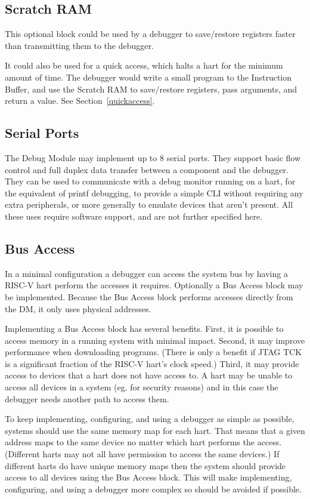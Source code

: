 \documentclass{article}
\begin{document}
\subsection{Scratch RAM}

This optional block could be used by a debugger to save/restore registers
faster than transmitting them to the debugger.

It could also be used for a quick access, which halts a hart for the minimum
amount of time. The debugger would write a small program to the Instruction
Buffer, and use the Scratch RAM to save/restore registers, pass arguments, and
return a value. See Section~\ref{quickaccess}.

\subsection{Serial Ports}

The Debug Module may implement up to 8 serial ports. They support basic flow
control and full duplex data transfer between a component and the debugger.
They can be used to communicate with a debug monitor running on a hart, for the
equivalent of printf debugging, to provide a simple CLI without requiring any
extra peripherals, or more generally to emulate devices that aren't present.
All these uses require software support, and are not further specified here.

\subsection{Bus Access}

In a minimal configuration a debugger can access the system bus by having a
RISC-V hart perform the accesses it requires. Optionally a Bus Access block may
be implemented. Because the Bus Access block performs accesses directly from
the DM, it only uses physical addresses.

Implementing a Bus Access block has several benefits. First, it is possible to
access memory in a running system with minimal impact.  Second, it may improve
performance when downloading programs. (There is only a benefit if JTAG TCK is a
significant fraction of the RISC-V hart's clock speed.)  Third, it may provide
access to devices that a hart does not have access to. A hart may be unable to
access all devices in a system (eg. for security reasons) and in this case the
debugger needs another path to access them.

To keep implementing, configuring, and using a debugger as simple as possible,
systems should use the same memory map for each hart. That means that a given
address maps to the same device no matter which hart performs the access.
(Different harts may not all have permission to access the same devices.) If
different harts do have unique memory maps then the system should provide
access to all devices using the Bus Access block. This will make implementing,
configuring, and using a debugger more complex so should be avoided if
possible.
\end{document}
